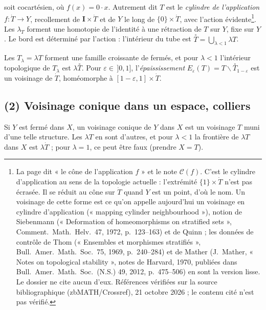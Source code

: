 \documentclass[11pt,a4paper]{article}
\begin{document}

soit cocartésien, où $f(x) = 0 \cdot x$. Autrement dit $T$ est le \emph{cylindre de
l'application} $f : \dot T \to Y$, recollement de $\mathbf{I} \times \dot T$ et de
$Y$ le long de $\{0\} \times \dot T$, avec l'action évidente\footnote{La page dit
« le cône de l'application $f$ » et le note $\mathcal{C}(f)$. C'est le cylindre
d'application au sens de la topologie actuelle : l'extrémité $\{1\} \times \dot T$
n'est pas écrasée. Il se réduit au cône sur $\dot T$ quand $Y$ est un point, d'où le
nom. Un voisinage de cette forme est ce qu'on appelle aujourd'hui un voisinage en
cylindre d'application (« mapping cylinder neighbourhood »), notion de Siebenmann (« Deformation of homeomorphisms on stratified sets », Comment.\ Math.\ Helv.\ 47, 1972, p.~123--163) et de Quinn ; les données de contrôle de Thom (« Ensembles et morphismes stratifiés », Bull.\ Amer.\ Math.\ Soc.\ 75, 1969, p.~240--284) et de Mather (J.~Mather, « Notes on topological stability », notes de Harvard, 1970, publiées dans Bull.\ Amer.\ Math.\ Soc.\ (N.S.) 49, 2012, p.~475--506) en sont la version lisse. Le dossier ne cite aucun d'eux. Références vérifiées sur la source bibliographique (zbMATH/Crossref), 21 octobre 2026 ; le contenu cité n'est pas vérifié.}. Les $\lambda_T$ forment une
homotopie de l'identité à une rétraction de $T$ sur $Y$, fixe sur $Y$. Le bord est
déterminé par l'action : l'intérieur du tube est $\overset{\circ}{T} =
\bigcup_{\lambda < 1} \lambda T$.

Les $T_\lambda = \lambda T$ forment une famille croissante de fermés, et pour
$\lambda < 1$ l'intérieur topologique de $T_\lambda$ est $\lambda
\overset{\circ}{T}$. Pour $\varepsilon \in \,]0,1]$, l'\emph{épaississement}
$E_\varepsilon(T) = T \smallsetminus \overset{\circ}{T}_{1-\varepsilon}$ est un
voisinage de $\dot T$, homéomorphe à $[1-\varepsilon, 1] \times \dot T$.

\subsection*{(2) Voisinage conique dans un espace, colliers}

Si $Y$ est fermé dans $X$, un voisinage conique de $Y$ dans $X$ est un voisinage
$T$ muni d'une telle structure. Les $\lambda T$ en sont d'autres, et pour $\lambda
< 1$ la frontière de $\lambda T$ dans $X$ est $\lambda \dot T$ ; pour $\lambda = 1$,
ce peut être faux (prendre $X = T$).
\end{document}
